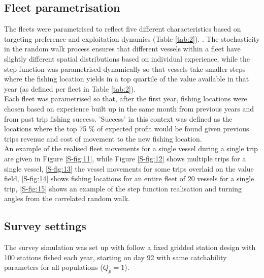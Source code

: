\documentclass[review]{elsarticle}
\begin{document}
\subsection{Fleet parametrisation}

The fleets were parametrised to reflect five different characteristics based
on targeting preference and exploitation dynamics (Table \ref{tab:2}).
.
The stochasticity in the random walk process ensures that different vessels
within a fleet have slightly different spatial distributions based on
individual experience, while the step function was parametrised dynamically so
that vessels take smaller steps where the fishing location yields in a top
quartile of the value available in that year (as defined per fleet in Table
\ref{tab:2}). \\

Each fleet was parametrised so that, after the first year, fishing locations
were chosen based on experience built up in the same month from previous years
and from past trip fishing success. 'Success' in this context was defined as
the locations where the top 75 \% of expected profit would be found given
previous trips revenue and cost of movement to the new fishing location. \\

An example of the realised fleet movements for a single vessel during a single
trip are given in Figure \ref{S-fig:11}, while Figure \ref{S-fig:12} shows
multiple trips for a single vessel,  \ref{S-fig:13} the
vessel movements for some trips overlaid on the value field,
 \ref{S-fig:14} shows fishing locations for an entire
fleet of 20 vessels for a single trip, 
\ref{S-fig:15} shows an example of the step function realisation and turning
angles from the correlated random walk.

\subsection{Survey settings}

The survey simulation was set up with follow a fixed gridded station design
with 100 stations fished each year, starting on day 92  with same catchability parameters for
all populations ($Q_{p} = 1$). 
\end{document}
